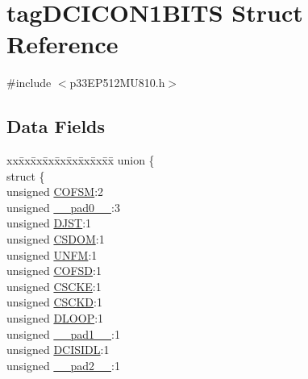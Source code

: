 \hypertarget{structtag_d_c_i_c_o_n1_b_i_t_s}{}\section{tag\+D\+C\+I\+C\+O\+N1\+B\+I\+TS Struct Reference}
\label{structtag_d_c_i_c_o_n1_b_i_t_s}


{\ttfamily \#include $<$p33\+E\+P512\+M\+U810.\+h$>$}

\subsection*{Data Fields}
\begin{DoxyCompactItemize}
\item 
\begin{tabbing}
xx\=xx\=xx\=xx\=xx\=xx\=xx\=xx\=xx\=\kill
union \{\\
\>struct \{\\
\>\>unsigned \hyperlink{structtag_d_c_i_c_o_n1_b_i_t_s_aaafe6ead9231e8ab858d8fbd86bbc6f4}{COFSM}:2\\
\>\>unsigned \hyperlink{structtag_d_c_i_c_o_n1_b_i_t_s_adf71f3d8410c1f1dbbc96680a92c49af}{\_\_pad0\_\_}:3\\
\>\>unsigned \hyperlink{structtag_d_c_i_c_o_n1_b_i_t_s_ab85fc503562df9fa90d1f0fbda204c88}{DJST}:1\\
\>\>unsigned \hyperlink{structtag_d_c_i_c_o_n1_b_i_t_s_a998a3bda3d9a1ccfda0c400c39d26579}{CSDOM}:1\\
\>\>unsigned \hyperlink{structtag_d_c_i_c_o_n1_b_i_t_s_ad54d7dbd66b1c00aa571a970933785fa}{UNFM}:1\\
\>\>unsigned \hyperlink{structtag_d_c_i_c_o_n1_b_i_t_s_ab96f39414efefbb3846f567495e7a198}{COFSD}:1\\
\>\>unsigned \hyperlink{structtag_d_c_i_c_o_n1_b_i_t_s_a358272da610843f0b2ddebff0b22ea5b}{CSCKE}:1\\
\>\>unsigned \hyperlink{structtag_d_c_i_c_o_n1_b_i_t_s_a01b94f7c9c17fec7f335a6e54685b4d8}{CSCKD}:1\\
\>\>unsigned \hyperlink{structtag_d_c_i_c_o_n1_b_i_t_s_ae2b5ccb8a1abaf1c3eede97ac70079cf}{DLOOP}:1\\
\>\>unsigned \hyperlink{structtag_d_c_i_c_o_n1_b_i_t_s_acaf2d0924a107ec6e8d2e31febaf66f9}{\_\_pad1\_\_}:1\\
\>\>unsigned \hyperlink{structtag_d_c_i_c_o_n1_b_i_t_s_a0f117adfe86d66adc4063ed2aabf65a8}{DCISIDL}:1\\
\>\>unsigned \hyperlink{structtag_d_c_i_c_o_n1_b_i_t_s_a4d97cc5f7d51d22fc2bf3eab35c9cb7f}{\_\_pad2\_\_}:1\\

\end{tabbing}
\end{DoxyCompactItemize}
